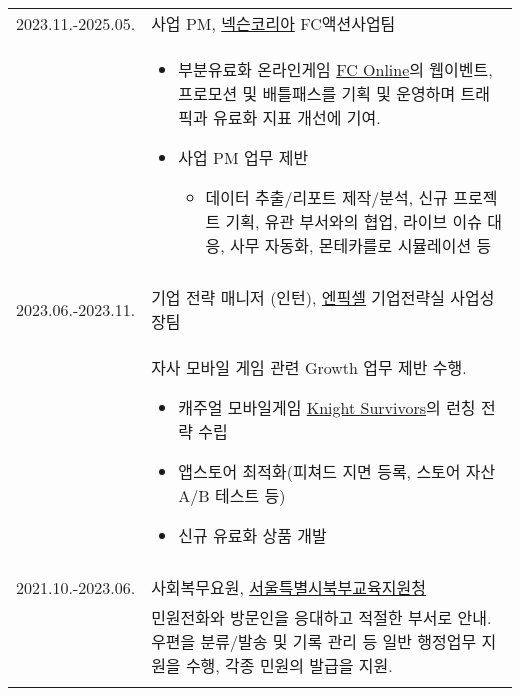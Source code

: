 \documentclass[a4paper]{article} %
\begin{document}
\begin{tabular}{r|p{11cm}}

    \textsc{2023.11.-2025.05.} & 사업 PM, \href{https://company.nexon.com/ko/}{넥슨코리아} FC액션사업팀 \\
    &\footnotesize{\vspace{-2mm}
        \begin{itemize}
            \item 부분유료화 온라인게임 \href{https://fconline.nexon.com}{FC Online}의 웹이벤트, 프로모션 및 배틀패스를
        기획 및 운영하며 트래픽과 유료화 지표 개선에 기여. 
    \item 사업 PM 업무 제반
        \begin{itemize}
            \item 데이터 추출/리포트 제작/분석, 신규 프로젝트 기획, 유관 부서와의 협업,
                라이브 이슈 대응, 사무 자동화, 몬테카를로 시뮬레이션 등
        \end{itemize}
\end{itemize}
\vspace{-5mm}
    }\\
    \multicolumn{2}{c}{} \\
	
    \textsc{2023.06.-2023.11.} & 기업 전략 매니저 (인턴),
\href{https://npixel.co.kr/}{엔픽셀} 기업전략실 사업성장팀 \\
&\footnotesize{
    자사 모바일 게임 관련 Growth 업무 제반 수행.
    \begin{itemize}
        \item 캐주얼 모바일게임 \href{https://pixelcraft.metapixel.io/}{Knight Survivors}의 런칭 전략 수립
        \item 앱스토어 최적화(피쳐드 지면 등록, 스토어 자산 A/B 테스트 등)
        \item 신규 유료화 상품 개발
    \end{itemize}\vspace{-5mm}
} \\
	\multicolumn{2}{c}{} \\
	
	\textsc{2021.10.-2023.06.} & 사회복무요원, \href{http://bbedu.sen.go.kr}{\textsc{서울특별시북부교육지원청}} \emph{}\\
	&\footnotesize{민원전화와 방문인을 응대하고 적절한 부서로 안내. 우편을 분류/발송 및 기록 관리 등 일반 행정업무 지원을 수행, 각종 민원의 발급을 지원.}\\
	\multicolumn{2}{c}{} \\
	

\end{tabular}
\end{document}
